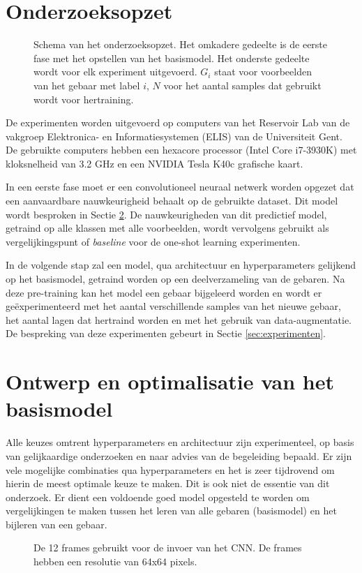 \section{Onderzoeksopzet}
\begin{figure}[t]
	\centering
	
	\caption{Schema van het onderzoeksopzet. Het omkadere gedeelte is de eerste fase met het opstellen van het basismodel. Het onderste gedeelte wordt voor elk experiment uitgevoerd. $G_i$ staat voor voorbeelden van het gebaar met label $i$, $N$ voor het aantal samples dat gebruikt wordt voor hertraining.}
\end{figure}
De experimenten worden uitgevoerd op computers van het Reservoir Lab van de vakgroep Elektronica- en Informatiesystemen (ELIS) van de Universiteit Gent. De gebruikte computers hebben een hexacore processor (Intel Core i7-3930K) met kloksnelheid van 3.2 GHz en een NVIDIA Tesla K40c grafische kaart.

\npar In een eerste fase moet er een convolutioneel neuraal netwerk worden opgezet dat een aanvaardbare nauwkeurigheid behaalt op de gebruikte dataset. Dit model wordt besproken in Sectie \ref{sec:basismodel}. De nauwkeurigheden van dit predictief model, getraind op alle klassen met alle voorbeelden, wordt vervolgens gebruikt als vergelijkingspunt of \textit{baseline} voor de one-shot learning experimenten.

\npar In de volgende stap zal een model, qua architectuur en hyperparameters gelijkend op het basismodel, getraind worden op een deelverzameling van de gebaren. Na deze pre-training kan het model een gebaar bijgeleerd worden en wordt er ge\"experimenteerd met het aantal verschillende samples van het nieuwe gebaar, het aantal lagen dat hertraind worden en met het gebruik van data-augmentatie. De bespreking van deze experimenten gebeurt in Sectie \ref{sec:experimenten}.

\section{Ontwerp en optimalisatie van het basismodel}\label{sec:basismodel}
Alle keuzes omtrent hyperparameters en architectuur zijn experimenteel, op basis van gelijkaardige onderzoeken en naar advies van de begeleiding bepaald. Er zijn vele mogelijke combinaties qua hyperparameters en het is zeer tijdrovend om hierin de meest optimale keuze te maken. Dit is ook niet de essentie van dit onderzoek. Er dient een voldoende goed model opgesteld te worden om vergelijkingen te maken tussen het leren van alle gebaren (basismodel) en het bijleren van een gebaar. 
\begin{figure}[t]
	\centering
	\def\svgwidth{0.5\columnwidth}
	
	\caption{De 12 frames gebruikt voor de invoer van het CNN. De frames hebben een resolutie van 64x64 pixels.}
	\label{fig:dataset-input}
\end{figure}
